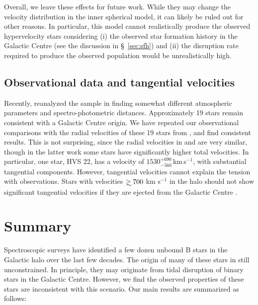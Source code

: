 \documentclass[fleqn,usenatbib]{mnras}
\newcommand\gsim{\mathrel{\rlap{\lower4pt\hbox{\hskip1pt$\sim$}}
    \raise1pt\hbox{$>$}}}
\begin{document}
Overall, we leave these effects for future work. While they may change the velocity distribution in the inner spherical model, it can likely be ruled out for other reasons. In particular, this model cannot realistically produce the observed hypervelocity stars considering (i) the observed star formation history in the Galactic Centre (see the discussion in \S~\ref{sec:sfh}) and (ii) the disruption rate required to produce the observed population would be unrealistically high. 




\subsection{Observational data and tangential velocities}
Recently, \citet{kreuzer+2020} reanalyzed the sample in \citet{warren_brown+2018} finding somewhat different atmospheric parameters and spectro-photometric distances. Approximately 19  stars remain consistent with a Galactic Centre origin. 
We have repeated our observational comparisons with the radial velocities of these 19 stars from \citep{kreuzer+2020}, and find consistent results. This is not surprising, since the radial velocities in \citet{warren_brown+2018} and \citet{kreuzer+2020} are very similar, though in the latter work some stars have significantly higher total velocities. In particular, one star, HVS 22, has a velocity of $1530^{+690}_{-560}$\,km\,s${}^{-1}$, with substantial tangential components. 
However, tangential velocities cannot explain the tension with observations. Stars with velocities $\gsim 700$ km s$^{-1}$ in the halo should not show significant tangential velocities if they are ejected from the Galactic Centre \citep{yu&madau2007}.  


\section{Summary}
\label{sec:summ}
Spectroscopic surveys have identified a few dozen unbound B stars in the Galactic halo over the last few decades. The origin of many of these stars in still unconstrained. In principle, they may originate from tidal disruption of binary stars in the Galactic Centre. However, we find the observed properties of these stars are inconsistent with this scenario. Our main results are summarized as follows:
\end{document}
